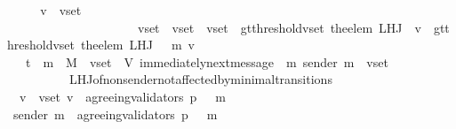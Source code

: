 \begin{isabellebody}
\ \isamarkupfalse%
\ \isamarkupfalse%
\ {\isachardoublequoteopen}{\isasymforall}\ v\ {\isasymin}\ v{\isacharunderscore}set{\isachardot}\isanewline
\ \ \ \ \ \ \ \ \ \ \ \ \ \ \ \ \ \ \ \ {\isacharparenleft}{\isasymforall}\ v{\isacharunderscore}set{\isacharprime}{\isachardot}\ \ v{\isacharunderscore}set{\isacharprime}\ {\isasymsubseteq}\ v{\isacharunderscore}set\ {\isasymand}\ gt{\isacharunderscore}threshold{\isacharparenleft}v{\isacharunderscore}set{\isacharprime}{\isacharcomma}\ the{\isacharunderscore}elem\ {\isacharparenleft}L{\isacharunderscore}H{\isacharunderscore}J\ {\isasymsigma}\ v{\isacharparenright}{\isacharparenright}\ {\isasymlongrightarrow}\ gt{\isacharunderscore}threshold{\isacharparenleft}v{\isacharunderscore}set{\isacharprime}{\isacharcomma}\ the{\isacharunderscore}elem\ {\isacharparenleft}L{\isacharunderscore}H{\isacharunderscore}J\ {\isacharparenleft}{\isasymsigma}\ {\isasymunion}\ {\isacharbraceleft}m{\isacharbraceright}{\isacharparenright}\ v{\isacharparenright}{\isacharparenright}{\isacharparenright}{\isachardoublequoteclose}\isanewline
\ \ \ \ \isamarkupfalse%
\ {\isacartoucheopen}{\isasymsigma}\ {\isasymin}\ {\isasymSigma}t\ {\isasymand}\ m\ {\isasymin}\ M\ {\isasymand}\ v{\isacharunderscore}set\ {\isasymsubseteq}\ V{\isacartoucheclose}\ {\isacartoucheopen}immediately{\isacharunderscore}next{\isacharunderscore}message\ {\isacharparenleft}{\isasymsigma}{\isacharcomma}\ m{\isacharparenright}{\isacartoucheclose}\ {\isacartoucheopen}sender\ m\ {\isasymin}\ v{\isacharunderscore}set{\isacartoucheclose}\isanewline
\ \ \ \ \ \ \ \ \ \ L{\isacharunderscore}H{\isacharunderscore}J{\isacharunderscore}of{\isacharunderscore}non{\isacharunderscore}sender{\isacharunderscore}not{\isacharunderscore}affected{\isacharunderscore}by{\isacharunderscore}minimal{\isacharunderscore}transitions\isanewline
\ \ \ \ \isamarkupfalse%
\isanewline
\ \ \isanewline
\ \ \isamarkupfalse%
\ \isamarkupfalse%
\ \isamarkupfalse%
\ {\isachardoublequoteopen}{\isasymforall}\ v\ {\isasymin}\ v{\isacharunderscore}set{\isachardot}\ v\ {\isasymin}\ agreeing{\isacharunderscore}validators\ {\isacharparenleft}p{\isacharcomma}\ {\isasymsigma}\ {\isasymunion}\ {\isacharbraceleft}m{\isacharbraceright}{\isacharparenright}{\isachardoublequoteclose}\isanewline
\ \ \isamarkupfalse%
\ {\isacharminus}\isanewline
\ \ \ \ \isamarkupfalse%
\ {\isachardoublequoteopen}sender\ m\ {\isasymin}\ agreeing{\isacharunderscore}validators\ {\isacharparenleft}p{\isacharcomma}\ {\isasymsigma}\ {\isasymunion}\ {\isacharbraceleft}m{\isacharbraceright}{\isacharparenright}{\isachardoublequoteclose}\isanewline

\end{isabellebody}
